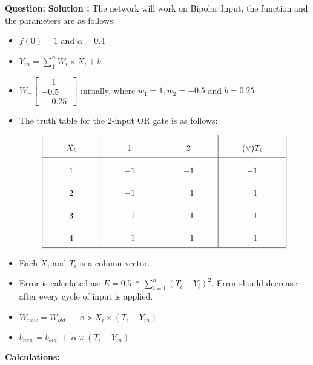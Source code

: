 \documentclass[12pt]{article}
\begin{document}
\textbf{Question: } 
\BlankLine	
\textbf{Solution :} The network will work on Bipolar Input, the function and the parameters are as follows:
\BlankLine
\begin{itemize}
	\item $ f(0) = 1 $ and $ \alpha =  0.4 $
	\item $ Y_{in} = \displaystyle \sum_{1}^{n} W_i \times X_i + b$
	\item $ W_ = \begin{bmatrix}
	\phantom{-}1 \\ -0.5 \\ \phantom{-}0.25 \ 
	\end{bmatrix}$ initially, where $w_1 = 1, w_2 = -0.5$ and $b = 0.25$
	
	\item The truth table for the 2-input OR gate is as follows:

		\[\arraycolsep=1cm\def\arraystretch{2.2}
		\begin{array}{|c|c c|c|}
			X_i & 1 & 2 & (\lor) T_i\\
			\hline 
			1 & -1 & -1 & -1\\
			2 & -1 & \phantom{-}1 &  \phantom{-}1\\ 
			3 & \phantom{-}1 & -1 & \phantom{-} 1\\
			4 & \phantom{-}1 &  \phantom{-}1 &  \phantom{-}1\\
			\hline
		\end{array}\]
	
	\item Each $X_i$ and $T_i$ is a column vector.
	
	\item Error is calculated as: $ E = 0.5 \ * \ \displaystyle \sum_{i=1}^{n} (T_i - Y_i)^{2} $. Error should decrease after every cycle of input is applied.
	
	\item $W_{new} = W_{old}\ +\ \alpha \times X_i \times (T_i - Y_{in})$  
	
	\item $b_{new} = b_{old}\ +\ \alpha \times (T_i - Y_{in})$  
	
\end{itemize}
\BlankLine
\BlankLine
\textbf{Calculations: }
\end{document}

